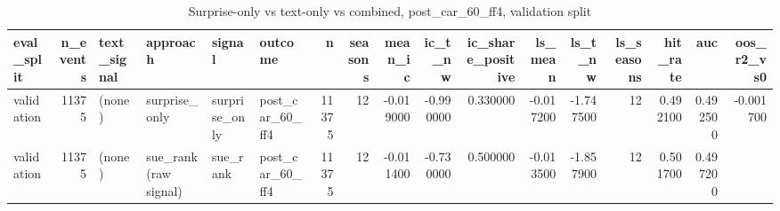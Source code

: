 \begin{table}
\caption{Surprise-only vs text-only vs combined, post_car_60_ff4, validation split}
\label{tab:t7_compare__post_car_60_ff4__validation}
\begin{tabular}{lrllllrrrrrrrrrrr}
\toprule
eval\_split & n\_events & text\_signal & approach & signal & outcome & n & seasons & mean\_ic & ic\_t\_nw & ic\_share\_positive & ls\_mean & ls\_t\_nw & ls\_seasons & hit\_rate & auc & oos\_r2\_vs0 \\
\midrule
validation & 11375 & (none) & surprise\_only & surprise\_only & post\_car\_60\_ff4 & 11375 & 12 & -0.019000 & -0.990000 & 0.330000 & -0.017200 & -1.747500 & 12 & 0.492100 & 0.492500 & -0.001700 \\
validation & 11375 & (none) & sue\_rank (raw signal) & sue\_rank & post\_car\_60\_ff4 & 11375 & 12 & -0.011400 & -0.730000 & 0.500000 & -0.013500 & -1.857900 & 12 & 0.501700 & 0.497200 &  \\
\bottomrule
\end{tabular}
\end{table}
